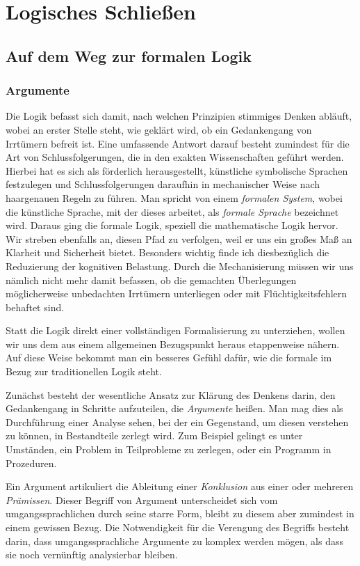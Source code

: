
\chapter{Logisches Schließen}

\section{Auf dem Weg zur formalen Logik}

\subsection{Argumente}

Die Logik befasst sich damit, nach welchen Prinzipien stimmiges Denken
abläuft, wobei an erster Stelle steht, wie geklärt wird, ob ein
Gedankengang von Irrtümern befreit ist. Eine umfassende Antwort darauf
besteht zumindest für die Art von Schlussfolgerungen, die in den exakten
Wissenschaften geführt werden. Hierbei hat es sich als förderlich
herausgestellt, künstliche symbolische Sprachen festzulegen und
Schlussfolgerungen daraufhin in mechanischer Weise nach haargenauen
Regeln zu führen. Man spricht von einem \emph{formalen System}, wobei
die künstliche Sprache, mit der dieses arbeitet, als \emph{formale Sprache}
bezeichnet wird. Daraus ging die formale Logik, speziell die
mathematische Logik hervor. Wir streben ebenfalls an, diesen Pfad zu
verfolgen, weil er uns ein großes Maß an Klarheit und Sicherheit bietet.
Besonders wichtig finde ich diesbezüglich die Reduzierung der kognitiven
Belastung. Durch die Mechanisierung müssen wir uns nämlich nicht mehr
damit befassen, ob die gemachten Überlegungen möglicherweise unbedachten
Irrtümern unterliegen oder mit Flüchtigkeitsfehlern behaftet sind.

Statt die Logik direkt einer vollständigen Formalisierung zu unterziehen,
wollen wir uns dem aus einem allgemeinen Bezugspunkt heraus etappenweise
nähern. Auf diese Weise bekommt man ein besseres Gefühl dafür, wie die
formale im Bezug zur traditionellen Logik steht.

Zunächst besteht der wesentliche Ansatz zur Klärung des Denkens darin,
den Gedankengang in Schritte aufzuteilen, die \emph{Argumente} heißen.
Man mag dies als Durchführung einer Analyse sehen, bei der ein Gegenstand,
um diesen verstehen zu können, in Bestandteile zerlegt wird. Zum Beispiel
gelingt es unter Umständen, ein Problem in Teilprobleme zu zerlegen,
oder ein Programm in Prozeduren.

Ein Argument artikuliert die Ableitung einer \emph{Konklusion} aus
einer oder mehreren \emph{Prämissen}. Dieser Begriff von Argument
unterscheidet sich vom umgangssprachlichen durch seine starre Form, bleibt
zu diesem aber zumindest in einem gewissen Bezug. Die Notwendigkeit für
die Verengung des Begriffs besteht darin, dass umgangssprachliche Argumente
zu komplex werden mögen, als dass sie noch vernünftig analysierbar bleiben.

